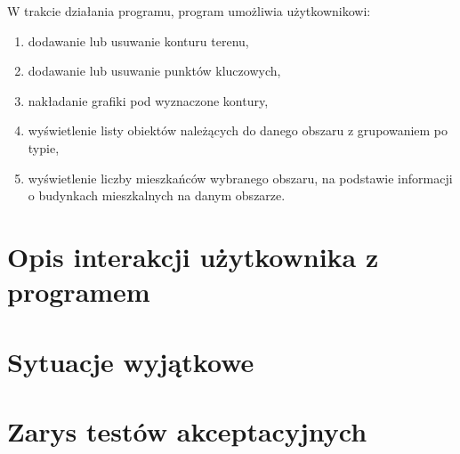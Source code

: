 \documentclass[a4paper,12pt]{article}
\newcommand\tab[1][0.6cm]{\hspace*{#1} }
\begin{document}
\tab W trakcie działania programu, program umożliwia użytkownikowi:
\begin{enumerate}
\item dodawanie lub usuwanie konturu terenu,
\item dodawanie lub usuwanie punktów kluczowych, 
\item nakładanie grafiki pod wyznaczone kontury,
\item wyświetlenie listy obiektów należących do danego obszaru z grupowaniem po typie,
\item wyświetlenie liczby mieszkańców wybranego obszaru, na podstawie informacji o budynkach mieszkalnych na danym obszarze.
\end{enumerate}

\section{Opis interakcji użytkownika z programem}



\section{Sytuacje wyjątkowe}

\section{Zarys testów akceptacyjnych}
\end{document}

